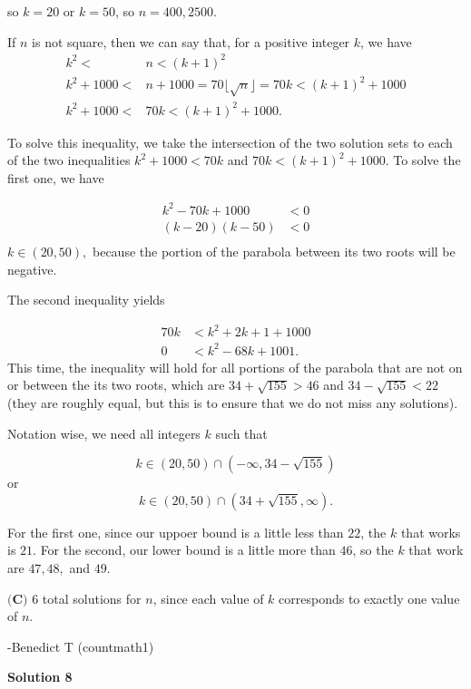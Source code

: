\begin{enumerate}
 so $k = 20$ or $k= 50$, so $n = 400, 2500.$

 If $n$ is not square, then we can say that, for a positive integer $k$, we have \begin{align*}k^2 < &n < (k+1)^2 \\k^2 + 1000 < &n + 1000  = 70\lfloor \sqrt{n} \rfloor = 70k< (k+1)^2 + 1000 \\k^2 + 1000 < &70k < (k+1)^2 + 1000.\end{align*}


 To solve this inequality, we take the intersection of the two solution sets to each of the two inequalities $k^2 + 1000 < 70k$ and $70k < (k+1)^2 + 1000$. To solve the first one, we have 

 \begin{align*}k^2 - 70k + 1000 &< 0 \\(k-20)(k-50) &< 0\\\end{align*}
$k\in (20, 50),$ because the portion of the parabola between its two roots will be negative. 

 The second inequality yields 

 \begin{align*}70k &< k^2 + 2k + 1 + 1000 \\0 &< k^2 -68k + 1001.\end{align*}
This time, the inequality will hold for all portions of the parabola that are not on or between the its two roots, which are $34 + \sqrt{155}>46$ and $34-\sqrt{155}<22$ (they are roughly equal, but this is to ensure that we do not miss any solutions). 

 Notation wise, we need all integers $k$ such that 

 
 \[k \in \left(20, 50\right) \cap \left(-\infty,34 - \sqrt{155} \right)\]or 
 \[k \in \left(20, 50\right) \cap \left(34 + \sqrt{155}, \infty \right).\]

 For the first one, since our uppoer bound is a little less than $22$, the $k$ that works is $21$. For the second, our lower bound is a little more than $46$, so the $k$ that work are $47, 48,$ and  $49$. 

 $\boxed{\textbf{(C) }6}$ total solutions for $n$, since each value of $k$ corresponds to exactly one value of $n$. 

 -Benedict T (countmath1)

 



\textbf{Solution 8}


\end{enumerate}
